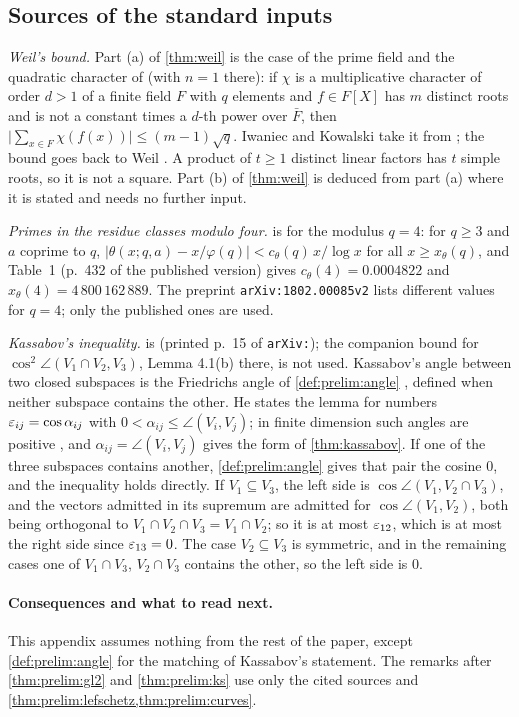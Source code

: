 \subsection{Sources of the standard inputs}\label{subsec:external:sources}

\emph{Weil's bound.} Part (a) of \cref{thm:weil} is the case of the prime
field and the quadratic character of \cite[Theorem~11.23]{IwaniecKowalski}
(with $n=1$ there): if $\chi$ is a multiplicative character of order $d>1$
of a finite field $F$ with $q$ elements and $f\in F[X]$ has $m$ distinct
roots and is not a constant times a $d$-th power over $\bar F$, then
$\big|\sum_{x\in F}\chi(f(x))\big|\le(m-1)\sqrt q$. Iwaniec and Kowalski
take it from \cite[Theorem~2C$'$]{Schmidt76}; the bound goes back to Weil
\cite{Weil48,Weil49}. A product of $t\ge1$ distinct linear factors has $t$
simple roots, so it is not a square. Part (b) of \cref{thm:weil} is deduced
from part (a) where it is stated and needs no further input.

\emph{Primes in the residue classes modulo four.}  is
\cite[Theorem~1.2]{BMOR18} for the modulus $q=4$: for $q\ge3$ and $a$ coprime
to $q$, $|\theta(x;q,a)-x/\varphi(q)|<c_\theta(q)\,x/\log x$ for all
$x\ge x_\theta(q)$, and Table~1 (p.~432 of the published version) gives
$c_\theta(4)=0.0004822$ and $x_\theta(4)=4\,800\,162\,889$. The preprint
\texttt{arXiv:\allowbreak1802.00085v2} lists different values for $q=4$; only
the published ones are used.

\emph{Kassabov's inequality.}  is
\cite[Lemma~4.2(b)]{Kassabov} (printed p.~15 of
\texttt{arXiv:}); the companion bound for
$\cos^2\angle(V_1\cap V_2,V_3)$, Lemma 4.1(b) there, is not used. Kassabov's
angle between two closed subspaces is the Friedrichs angle of
\cref{def:prelim:angle} \cite[Definition~3.2]{Kassabov}, defined when neither
subspace contains the other. He states the lemma for numbers
$\varepsilon_{ij}=\cos\alpha_{ij}$ with $0<\alpha_{ij}\le\angle(V_i,V_j)$; in finite
dimension such angles are positive \cite[Corollary~3.7]{Kassabov}, and
$\alpha_{ij}=\angle(V_i,V_j)$ gives the form of \cref{thm:kassabov}. If one of
the three subspaces contains another, \cref{def:prelim:angle} gives that
pair the cosine $0$, and the inequality holds directly. If $V_1\subseteq V_3$,
the left side is $\cos\angle(V_1,V_2\cap V_3)$, and the vectors admitted in its
supremum are admitted for $\cos\angle(V_1,V_2)$, both being orthogonal to
$V_1\cap V_2\cap V_3=V_1\cap V_2$; so it is at most $\varepsilon_{12}$, which is at
most the right side since $\varepsilon_{13}=0$. The case $V_2\subseteq V_3$ is
symmetric, and in the remaining cases one of $V_1\cap V_3$, $V_2\cap V_3$
contains the other, so the left side is $0$.

\paragraph{Consequences and what to read next.}
This appendix assumes nothing from the rest of the paper, except \cref{def:prelim:angle} for the
matching of Kassabov's statement. The remarks after \cref{thm:prelim:gl2}
and \cref{thm:prelim:ks} use only the cited sources and
\cref{thm:prelim:lefschetz,thm:prelim:curves}.
